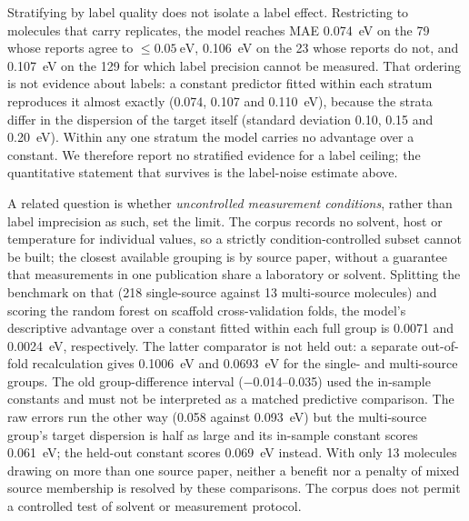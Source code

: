 Stratifying by label quality does not isolate a label effect. Restricting to molecules that carry replicates, the model reaches MAE
\qty{0.074}{\electronvolt} on the \num{79} whose reports agree to
$\le\qty{0.05}{\electronvolt}$, \qty{0.106}{\electronvolt} on the \num{23} whose
reports do not, and \qty{0.107}{\electronvolt} on the \num{129} for which label
precision cannot be measured. That ordering is not evidence about labels: a constant
predictor fitted within each stratum reproduces it almost exactly
(\qty{0.074}{}, \qty{0.107}{} and \qty{0.110}{\electronvolt}), because the strata
differ in the dispersion of the target itself (standard deviation \qty{0.10}{},
\qty{0.15}{} and \qty{0.20}{\electronvolt}). Within any one stratum the model carries
no advantage over a constant. We therefore report no stratified evidence for a label
ceiling; the quantitative statement that survives is the label-noise estimate above.

A related question is whether \emph{uncontrolled measurement conditions}, rather than
label imprecision as such, set the limit. The corpus records no solvent, host or
temperature for individual values, so a strictly condition-controlled subset cannot be
built; the closest available grouping is by source paper, without a guarantee that
measurements in one publication share a laboratory or solvent. Splitting the benchmark on that
(\num{218} single-source against \num{13} multi-source molecules) and scoring the random
forest on scaffold cross-validation folds, the model's descriptive advantage
over a constant fitted within each full group is \qty{0.0071}{} and
\qty{0.0024}{\electronvolt}, respectively. The latter comparator is not held out:
a separate out-of-fold recalculation gives \qty{0.1006}{\electronvolt} and
\qty{0.0693}{\electronvolt} for the single- and multi-source groups. The old
group-difference interval (\numrange{-0.014}{0.035}) used the in-sample constants
and must not be interpreted as a matched predictive comparison. The raw
errors run the other way (\qty{0.058}{} against \qty{0.093}{\electronvolt}) but the
multi-source group's target dispersion is half as large and its in-sample constant
scores \qty{0.061}{\electronvolt}; the held-out constant scores
\qty{0.069}{\electronvolt} instead. With only \num{13} molecules drawing on
more than one source paper, neither a benefit nor a penalty of mixed source
membership is resolved by these comparisons. The corpus does not permit a
controlled test of solvent or measurement protocol.

